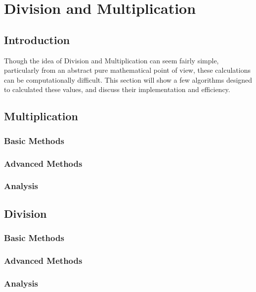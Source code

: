 \section{Division and Multiplication}
\label{SUB_"Division and Multiplication"}
\subsection{Introduction}
Though the idea of Division and Multiplication can seem fairly simple, particularly from an abstract pure mathematical point of view, these calculations can be computationally difficult. This section will show a few algorithms designed to calculated these values, and discuss their implementation and efficiency.

\subsection{Multiplication}
\subsubsection{Basic Methods}
\subsubsection{Advanced Methods}
\subsubsection{Analysis}

\subsection{Division}
\subsubsection{Basic Methods}
\subsubsection{Advanced Methods}
\subsubsection{Analysis}
